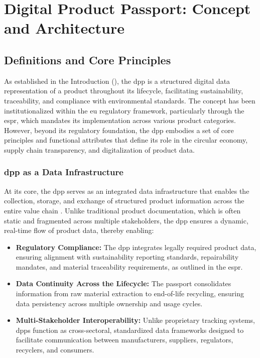 \section{Digital Product Passport: Concept and Architecture}
\label{sec:dpp_concept_architecture}

\subsection{Definitions and Core Principles}

As established in the Introduction (), the \acrlong{dpp} is a structured digital data representation of a product throughout its lifecycle, facilitating sustainability, traceability, and compliance with environmental standards. The concept has been institutionalized within the \ac{eu} regulatory framework, particularly through the \acrlong{espr}, which mandates its implementation across various product categories. However, beyond its regulatory foundation, the \ac{dpp} embodies a set of core principles and functional attributes that define its role in the circular economy, supply chain transparency, and digitalization of product data. \autocite{EuropeanParliamentandCouncil.2024}

\subsubsection*{\ac{dpp} as a Data Infrastructure}
At its core, the \ac{dpp} serves as an integrated data infrastructure that enables the collection, storage, and exchange of structured product information across the entire value chain \autocite{Jansen.2023}. Unlike traditional product documentation, which is often static and fragmented across multiple stakeholders, the \ac{dpp} ensures a dynamic, real-time flow of product data, thereby enabling:

\begin{itemize}[itemsep=0.5\baselineskip]
    \item \textbf{Regulatory Compliance:} The \ac{dpp} integrates legally required product data, ensuring alignment with sustainability reporting standards, repairability mandates, and material traceability requirements, as outlined in the \acrlong{espr}. \autocite{EuropeanParliamentandCouncil.2024}
    
    \item \textbf{Data Continuity Across the Lifecycle:} The passport consolidates information from raw material extraction to end-of-life recycling, ensuring data persistency across multiple ownership and usage cycles. \autocite{Jansen.2023}
    
    \item \textbf{Multi-Stakeholder Interoperability:} Unlike proprietary tracking systems, \ac{dpp}s function as cross-sectoral, standardized data frameworks designed to facilitate communication between manufacturers, suppliers, regulators, recyclers, and consumers. \autocite{Pietron.2023}
\end{itemize}

